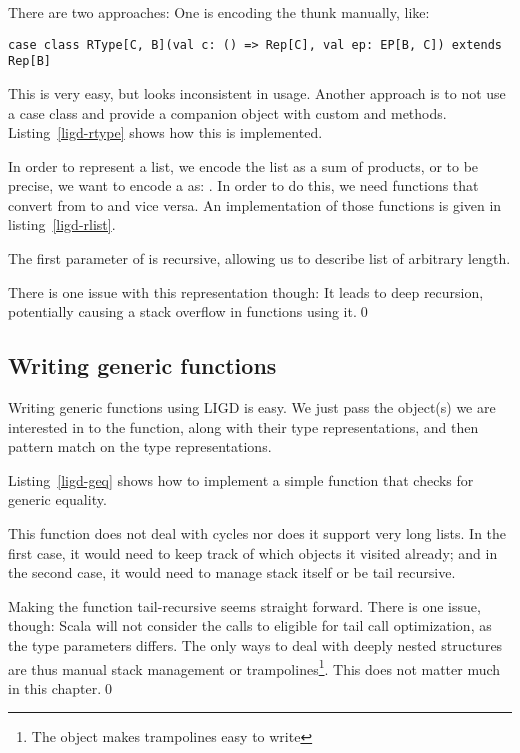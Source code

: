 There are two approaches: One is encoding the thunk manually, like:
\begin{lstlisting}[gobble=2]
  case class RType[C, B](val c: () => Rep[C], val ep: EP[B, C]) extends Rep[B]
\end{lstlisting}
This is very easy, but looks inconsistent in usage. Another approach is to
not use a case class and provide a companion object with custom 
and  methods. Listing~\ref{ligd-rtype} shows how this is
implemented.


\begin{example}[Lists]
In order to represent a list, we encode the
list as a sum of products, or to be precise, we want to encode a 
as: . In order to do this, we need functions
that convert from  to  and
vice versa. An implementation of those functions is given in listing~\ref{ligd-rlist}.


The first parameter of  is recursive, allowing us to describe list
of arbitrary length.

There is one issue with this representation though: It leads to deep recursion,
potentially causing a stack overflow in functions using it.\qed
\end{example}

\subsection{Writing generic functions}
Writing generic functions using LIGD is easy. We just pass the object(s)
we are interested in to the function, along with their type representations,
and then pattern match on the type representations.

\begin{example}
Listing~\ref{ligd-geq} shows how to implement a simple function that checks for
generic equality.

  

This function does not deal with cycles nor does it support very long lists. In
the first case, it would need to keep track of which objects it visited already;
and in the second case, it would need to manage stack itself or be tail recursive.

Making the function tail-recursive seems straight forward. There is one issue,
though: Scala will not consider the calls to  eligible for tail call
optimization, as the type parameters differs. The only ways to deal with deeply
nested structures are thus manual stack management or trampolines\footnote{The
 object makes trampolines easy to write}. This
does not matter much in this chapter.\qed
\end{example}


